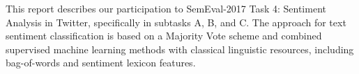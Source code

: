 This report describes our participation to SemEval-2017 Task 4: Sentiment Analysis in Twitter, specifically in subtasks A, B, and C. The approach for text sentiment classification is based on a Majority Vote scheme and combined supervised machine learning methods with classical linguistic resources, including bag-of-words and sentiment lexicon features.
